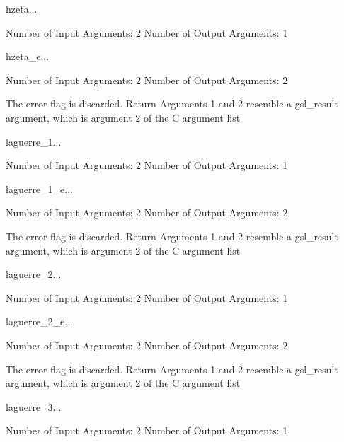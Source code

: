 \begin{funcdesc}{hzeta}{...}

    Number of Input  Arguments:  2
    Number of Output Arguments:  1
\end{funcdesc}

\begin{funcdesc}{hzeta_e}{...}

    Number of Input  Arguments:  2
    Number of Output Arguments:  2

The error flag is discarded.
Return Arguments 1 and 2 resemble a gsl_result argument,
	which is  argument 2 of the C argument list

\end{funcdesc}

\begin{funcdesc}{laguerre_1}{...}

    Number of Input  Arguments:  2
    Number of Output Arguments:  1
\end{funcdesc}

\begin{funcdesc}{laguerre_1_e}{...}

    Number of Input  Arguments:  2
    Number of Output Arguments:  2

The error flag is discarded.
Return Arguments 1 and 2 resemble a gsl_result argument,
	which is  argument 2 of the C argument list

\end{funcdesc}

\begin{funcdesc}{laguerre_2}{...}

    Number of Input  Arguments:  2
    Number of Output Arguments:  1
\end{funcdesc}

\begin{funcdesc}{laguerre_2_e}{...}

    Number of Input  Arguments:  2
    Number of Output Arguments:  2

The error flag is discarded.
Return Arguments 1 and 2 resemble a gsl_result argument,
	which is  argument 2 of the C argument list

\end{funcdesc}

\begin{funcdesc}{laguerre_3}{...}

    Number of Input  Arguments:  2
    Number of Output Arguments:  1
\end{funcdesc}

